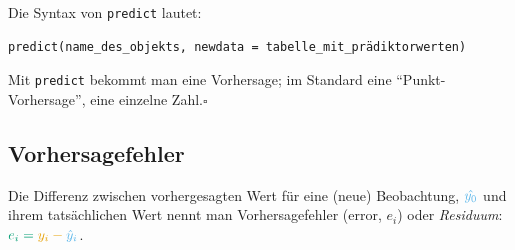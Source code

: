 \documentclass[
  a4paper,
]{scrbook}
\theoremstyle{definition}
\theoremstyle{definition}
\theoremstyle{definition}
\theoremstyle{remark}
\begin{document}
Die Syntax von \texttt{predict} lautet:

\begin{verbatim}
predict(name_des_objekts, newdata = tabelle_mit_prädiktorwerten)
\end{verbatim}

\begin{tcolorbox}[enhanced jigsaw, colbacktitle=quarto-callout-note-color!10!white, bottomrule=.15mm, left=2mm, breakable, rightrule=.15mm, coltitle=black, title=\textcolor{quarto-callout-note-color}{\faInfo}\hspace{0.5em}{Hinweis}, colback=white, leftrule=.75mm, titlerule=0mm, opacityback=0, bottomtitle=1mm, toprule=.15mm, arc=.35mm, toptitle=1mm, opacitybacktitle=0.6, colframe=quarto-callout-note-color-frame]

Mit \texttt{predict} bekommt man eine Vorhersage; im Standard eine
``Punkt-Vorhersage'', eine einzelne Zahl.\(\square\)

\end{tcolorbox}

\subsection{Vorhersagefehler}\label{vorhersagefehler}

Die Differenz zwischen vorhergesagten Wert für eine (neue) Beobachtung,
\(\color{modelcol}{\hat{y_0}}\) und ihrem tatsächlichen Wert nennt man
Vorhersagefehler (error, \(e_i\)) oder \emph{Residuum}:
\(\color{errorcol}{e_i} = \color{ycol}{y_i} - \color{modelcol}{\hat{y}_i}\).
\end{document}
